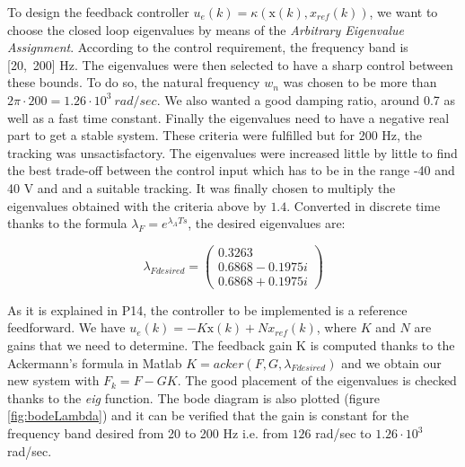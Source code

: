 To design the feedback controller $u_e(k) = \kappa (\text{x}(k),x_{ref}(k))$, we want to choose the closed loop eigenvalues by means of the \textit{Arbitrary Eigenvalue Assignment}. 
According to the control requirement, the frequency band is [20,\ 200] Hz. The eigenvalues were then selected to have a sharp control between these bounds. To do so, the natural frequency $w_n$ was chosen to be more than $2\pi \cdot 200 = 1.26 \cdot 10^3 \ rad/sec$. We also wanted a good damping ratio, around 0.7 as well as a fast time constant. Finally the eigenvalues need to have a negative real part to get a stable system. These criteria were fulfilled but for 200 Hz, the tracking was unsactisfactory. The eigenvalues were increased little by little to find the best trade-off between the control input which has to be in the range -40 and 40 V and and a suitable tracking. It was finally chosen to multiply the eigenvalues obtained with the criteria above by $1.4$. Converted in discrete time thanks to the formula $\lambda_F = e^{\lambda_A Ts}$, the desired eigenvalues are:

\begin{equation*}
\lambda_{Fdesired} =  \begin{pmatrix}
0.3263\\
0.6868 - 0.1975i\\
0.6868 + 0.1975i
\end{pmatrix}
\end{equation*}

As it is explained in P14, the controller to be implemented is a reference feedforward. We have $u_e(k) = -K\text{x}(k) + Nx_{ref}(k)$, where $K$ and $N$ are gains that we need to determine.
The feedback gain K is computed thanks to the Ackermann's formula in Matlab $K = acker(F,G,\lambda_{Fdesired})$ and we obtain our new system with $F_k = F-GK$. The good placement of the eigenvalues is checked thanks to the \textit{eig} function. The bode diagram is also plotted (figure \ref{fig:bodeLambda}) and it can be verified that the gain is constant for the frequency band desired from 20 to 200 Hz i.e. from $126$ rad/sec to $1.26 \cdot 10^3$ rad/sec. 

